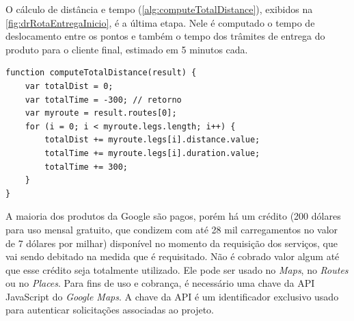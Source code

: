 O cálculo de distância e tempo (\autoref{alg:computeTotalDistance}), exibidos na \autoref{fig:drRotaEntregaInicio}, é a última etapa. Nele é computado o tempo de deslocamento entre os pontos e também o tempo dos trâmites de entrega do produto para o cliente final, estimado em 5 minutos cada.

\begin{lstlisting}[caption={Delivery Routes - Função de cálculo do deslocamento}, style=htmlcssjs, label=alg:computeTotalDistance]
function computeTotalDistance(result) {
    var totalDist = 0;
    var totalTime = -300; // retorno
    var myroute = result.routes[0];
    for (i = 0; i < myroute.legs.length; i++) {
        totalDist += myroute.legs[i].distance.value;
        totalTime += myroute.legs[i].duration.value;
        totalTime += 300;
    }
}
\end{lstlisting}

A maioria dos produtos da Google são pagos, porém há um crédito (200 dólares para uso mensal gratuito, que condizem com até 28 mil carregamentos no valor de 7 dólares por milhar) disponível no momento da requisição dos serviços, que vai sendo debitado na medida que é requisitado. Não é cobrado valor algum até que esse crédito seja totalmente utilizado. Ele pode ser usado no \textit{Maps}, no \textit{Routes} ou no \textit{Places}. Para fins de uso e cobrança, é necessário uma chave da API JavaScript do \textit{Google Maps}. A chave da API é um identificador exclusivo usado para autenticar solicitações associadas ao projeto.
